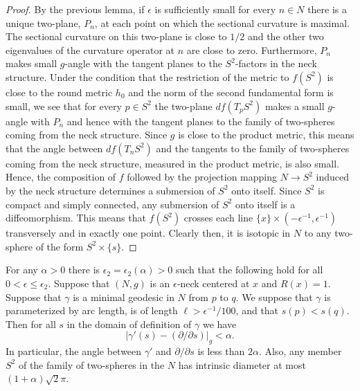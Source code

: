 \begin{proof}
By the previous lemma, if $\epsilon$ is sufficiently small for every
$n\in N$  there is a unique two-plane, $P_n$, at each point on which
the sectional curvature is maximal. The sectional curvature on this
two-plane is close to $1/2$ and the other two eigenvalues of the
curvature operator at $n$ are close to zero. Furthermore, $P_n$
makes small $g$-angle with the tangent planes to the $S^2$-factors
in the neck structure. Under the condition that the restriction of
the metric to $f(S^2)$ is close to the round metric $h_0$ and the
norm of the second fundamental form is small, we see that for every
$p\in S^2$ the two-plane $df(T_pS^2)$ makes a small $g$-angle with
$P_n$ and hence with the tangent planes to the family of two-spheres
coming from the neck structure. Since $g$ is close to the product
metric, this means that the angle between $df (T_nS^2)$ and the
tangents to the family of two-spheres coming from the neck
structure, measured in the product metric, is also small. Hence, the
composition of $f$ followed by the projection mapping $N\to S^2$
induced by the neck structure determines a submersion of $S^2$ onto
itself. Since $S^2$ is compact and simply connected, any submersion
of $S^2$ onto itself is a diffeomorphism. This means that $f(S^2)$
crosses each line $\{x\}\times (-\epsilon^{-1},\epsilon^{-1})$
transversely and in exactly one point. Clearly then, it is isotopic
in $N$ to any two-sphere of the form $S^2\times \{s\}$.
\end{proof}


\begin{lemma}
\label{lem:neck-geodesic-directions}
\label{directions}
 For any $\alpha>0$  there is $\epsilon_2=\epsilon_2(\alpha)>0$
such that the following hold for all $0<\epsilon\le \epsilon_2$.
Suppose that $(N,g)$ is an $\epsilon$-neck centered at $x$ and
$R(x)=1$. Suppose that $\gamma$ is a minimal geodesic in  $N$ from
$p$ to $q$. We suppose that $\gamma$ is parameterized by arc length,
is of length $\ell>\epsilon^{-1}/100$, and that $s(p)<s(q)$. Then
for all $s$ in the domain of definition of $\gamma$ we have
$$|\gamma'(s)-(\partial/\partial s)|_g<\alpha.$$
 In particular, the angle between $\gamma'$ and $\partial/\partial
s$ is less than $2\alpha$.
 Also,  any
member $S^2$ of the family of two-spheres in the $N$ has intrinsic
diameter at most $(1+\alpha)\sqrt{2}\pi$.
\end{lemma}


